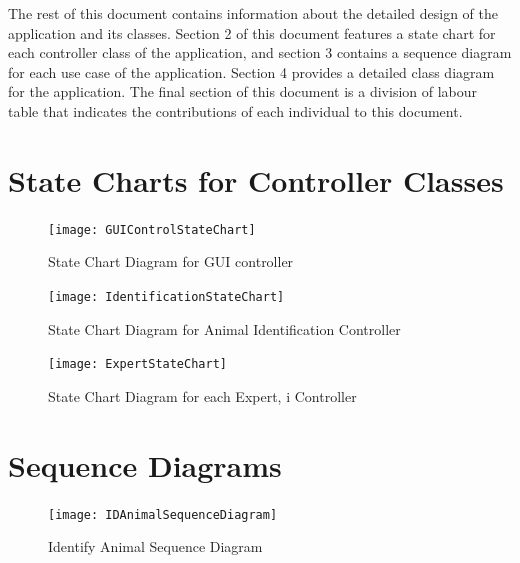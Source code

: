 \documentclass[]{article}
\begin{document}
The rest of this document contains information about the detailed design of the application and its classes. Section 2 of this document features a state chart for each controller class of the application, and section 3 contains a sequence diagram for each use case of the application. Section 4 provides a detailed class diagram for the application. The final section of this document is a division of labour table that indicates the contributions of each individual to this document.



\section{State Charts for Controller Classes}
\label{sec:state_charts_for_controller_classes}
\begin{figure}[H]
	\centering
	\texttt{[image: GUIControlStateChart]}
	\caption{State Chart Diagram for GUI controller}
	\label{State Chart Diagram for GUI controller}
\end{figure}

\begin{figure}[H]
	\centering
	\texttt{[image: IdentificationStateChart]}
	\caption{State Chart Diagram for Animal Identification Controller}
	\label{State Chart Diagram for Animal Identification Controller}
\end{figure}

\begin{figure}[H]
	\centering
	\texttt{[image: ExpertStateChart]}
	\caption{State Chart Diagram for each Expert, i Controller}
	\label{State Chart Diagram for each Expert, i Controller}
\end{figure}


\section{Sequence Diagrams}
\label{sec:sequence_diagrams}
\begin{figure}[H]
	\centering
	\texttt{[image: IDAnimalSequenceDiagram]}
	\caption{Identify Animal Sequence Diagram}
	\label{Identify Animal Sequence Diagram}
\end{figure}
\end{document}
